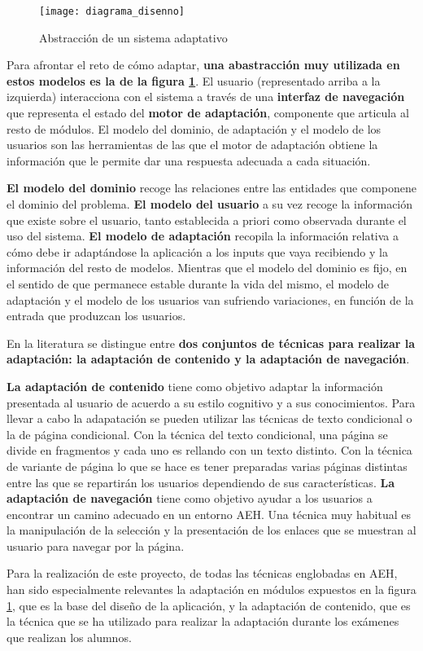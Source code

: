 \begin{figure}[htp!]
	\centering
	\texttt{[image: diagrama\_disenno]}
	\caption{Abstracción de un sistema adaptativo}
	\label{fig:diagrama_disenno}
\end{figure}

Para afrontar el reto de cómo adaptar, \textbf{una abastracción muy utilizada en estos modelos es la de la figura \ref{fig:diagrama_disenno}}\cite{Benyon93}. El usuario (representado arriba a la izquierda) interacciona con el sistema a través de una \textbf{interfaz de navegación} que representa el estado del \textbf{motor de adaptación}, componente que articula al resto de módulos. El modelo del dominio, de adaptación y el modelo de los usuarios son las herramientas de las que el motor de adaptación obtiene la información que le permite dar una respuesta adecuada a cada situación. 

\textbf{El modelo del dominio} recoge las relaciones entre las entidades que componene el dominio del problema. \textbf{El modelo del usuario} a su vez recoge la información que existe sobre el usuario, tanto establecida a priori como observada durante el uso del sistema. \textbf{El modelo de adaptación} recopila la información relativa a cómo debe ir adaptándose la aplicación a los inputs que vaya recibiendo y la información del resto de modelos. Mientras que el modelo del dominio es fijo, en el sentido de que permanece estable durante la vida del mismo, el modelo de adaptación y el modelo de los usuarios van sufriendo variaciones, en función de la entrada que produzcan los usuarios.

En la literatura se distingue entre \textbf{dos conjuntos de técnicas para realizar la adaptación: la adaptación de contenido y la adaptación de navegación}\cite{Brusilovsky98}. 

\textbf{La adaptación de contenido} tiene como objetivo adaptar la información presentada al usuario de acuerdo a su estilo cognitivo y a sus conocimientos. Para llevar a cabo la adapatación se pueden utilizar las técnicas de texto condicional o la de página condicional. Con la técnica del texto condicional, una página se divide en fragmentos y cada uno es rellando con un texto distinto. Con la técnica de variante de página lo que se hace es tener preparadas varias páginas distintas entre las que se repartirán los usuarios dependiendo de sus características. \textbf{La adaptación de navegación} tiene como objetivo ayudar a los usuarios a encontrar un camino adecuado en un entorno \acrshort{AEH}. Una técnica muy habitual es la manipulación de la selección y la presentación de los enlaces que se muestran al usuario para navegar por la página\cite{Triantafillou03}.

Para la realización de este proyecto, de todas las técnicas englobadas en \acrshort{AEH}, han sido especialmente relevantes la adaptación en módulos expuestos en la figura \ref{fig:diagrama_disenno}, que es la base del diseño de la aplicación, y la adaptación de contenido, que es la técnica que se ha utilizado para realizar la adaptación durante los exámenes que realizan los alumnos.


